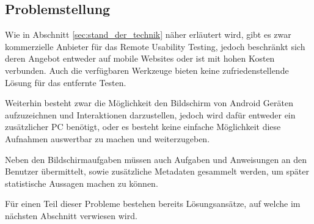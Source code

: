 \subsection{Problemstellung}
Wie in Abschnitt \ref{sec:stand_der_technik} näher erläutert wird, gibt es zwar kommerzielle Anbieter für das Remote Usability Testing, jedoch beschränkt sich deren Angebot entweder auf mobile Websites oder ist mit hohen Kosten verbunden.
Auch die verfügbaren Werkzeuge bieten keine zufriedenstellende Lösung für das entfernte Testen.

Weiterhin besteht zwar die Möglichkeit den Bildschirm von Android Geräten aufzuzeichnen und Interaktionen darzustellen, jedoch wird dafür entweder ein zusätzlicher PC benötigt, oder es besteht keine einfache Möglichkeit diese Aufnahmen auswertbar zu machen und weiterzugeben.

Neben den Bildschirmaufgaben müssen auch Aufgaben und Anweisungen an den Benutzer übermittelt, sowie zusätzliche Metadaten gesammelt werden, um später statistische Aussagen machen zu können.

Für einen Teil dieser Probleme bestehen bereits Lösungsansätze, auf welche im nächsten Abschnitt verwiesen wird.